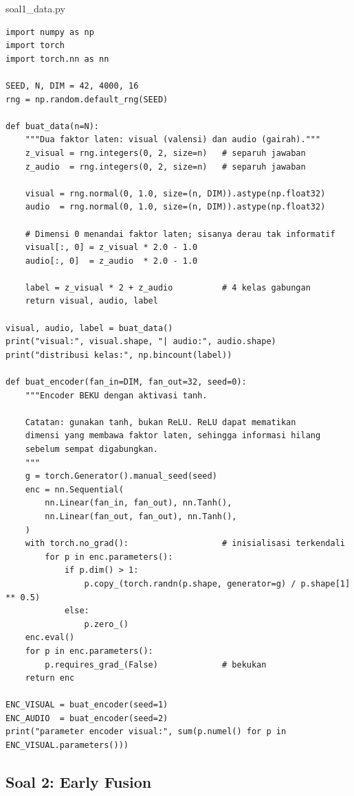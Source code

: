 \documentclass[12pt, a4paper]{article}
\begin{document}
\begin{codewindow}{soal1\_data.py}
\begin{lstlisting}[style=pycode]
import numpy as np
import torch
import torch.nn as nn

SEED, N, DIM = 42, 4000, 16
rng = np.random.default_rng(SEED)

def buat_data(n=N):
    """Dua faktor laten: visual (valensi) dan audio (gairah)."""
    z_visual = rng.integers(0, 2, size=n)   # separuh jawaban
    z_audio  = rng.integers(0, 2, size=n)   # separuh jawaban

    visual = rng.normal(0, 1.0, size=(n, DIM)).astype(np.float32)
    audio  = rng.normal(0, 1.0, size=(n, DIM)).astype(np.float32)

    # Dimensi 0 menandai faktor laten; sisanya derau tak informatif
    visual[:, 0] = z_visual * 2.0 - 1.0
    audio[:, 0]  = z_audio  * 2.0 - 1.0

    label = z_visual * 2 + z_audio          # 4 kelas gabungan
    return visual, audio, label

visual, audio, label = buat_data()
print("visual:", visual.shape, "| audio:", audio.shape)
print("distribusi kelas:", np.bincount(label))

def buat_encoder(fan_in=DIM, fan_out=32, seed=0):
    """Encoder BEKU dengan aktivasi tanh.

    Catatan: gunakan tanh, bukan ReLU. ReLU dapat mematikan
    dimensi yang membawa faktor laten, sehingga informasi hilang
    sebelum sempat digabungkan.
    """
    g = torch.Generator().manual_seed(seed)
    enc = nn.Sequential(
        nn.Linear(fan_in, fan_out), nn.Tanh(),
        nn.Linear(fan_out, fan_out), nn.Tanh(),
    )
    with torch.no_grad():                   # inisialisasi terkendali
        for p in enc.parameters():
            if p.dim() > 1:
                p.copy_(torch.randn(p.shape, generator=g) / p.shape[1] ** 0.5)
            else:
                p.zero_()
    enc.eval()
    for p in enc.parameters():
        p.requires_grad_(False)             # bekukan
    return enc

ENC_VISUAL = buat_encoder(seed=1)
ENC_AUDIO  = buat_encoder(seed=2)
print("parameter encoder visual:", sum(p.numel() for p in ENC_VISUAL.parameters()))
\end{lstlisting}
\end{codewindow}

\subsection{Soal 2: Early Fusion}
\label{sec:soal2}
\end{document}

